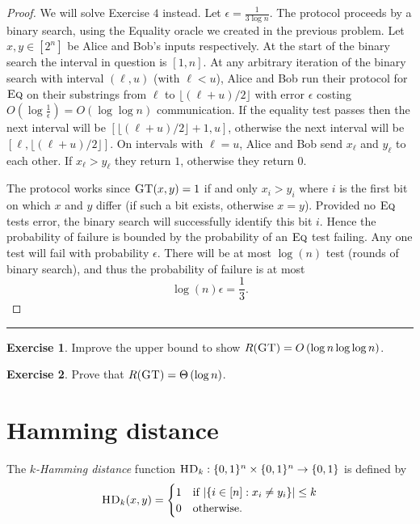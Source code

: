 \documentclass[11pt]{amsart}
\theoremstyle{plain}
\theoremstyle{definition}
\newtheorem{exercise}{Exercise}
\theoremstyle{plain}
\newcommand{\Eq}{\textsc{Eq}}
\newcommand{\GT}{\textsc{GT}}
\newcommand{\HD}{\textsc{HD}}
\newcommand{\exercises}{\bigskip \noindent\rule{8cm}{0.4pt} \medskip}
\begin{document}
\begin{proof}
We will solve Exercise $4$ instead. Let $\epsilon = \frac{1}{3\log n}$. The protocol proceeds by a binary search, using the Equality oracle we created in the previous problem. Let $x, y \in [2^n]$ be Alice and Bob's inputs respectively. At the start of the binary search the interval in question is $[1,n]$. At any arbitrary iteration of the binary search with interval $(\ell, u)$ (with $\ell < u$), Alice and Bob run their protocol for $\Eq$ on their substrings from $\ell$ to $\lfloor (\ell+u)/2 \rfloor$ with error $\epsilon$ costing $O(\log \frac{1}{\epsilon}) = O(\log\log n)$ communication. If the equality test passes then the next interval will be $[\lfloor (\ell+u)/2 \rfloor + 1, u]$, otherwise the next interval will be $[\ell, \lfloor (\ell+u)/2 \rfloor]$. On intervals with $\ell = u$, Alice and Bob send $x_\ell$ and $y_\ell$ to each other. If $x_\ell > y_\ell$ they return $1$, otherwise they return $0$.

The protocol works since $\GT(x,y) = 1$ if and only $x_i > y_i$ where $i$ is the first bit on which $x$ and $y$ differ (if such a bit exists, otherwise $x=y$). Provided no $\Eq$ tests error, the binary search will successfully identify this bit $i$. Hence the probability of failure is bounded by the probability of an $\Eq$ test failing. Any one test will fail with probability $\epsilon$. There will be at most $\log(n)$ test (rounds of binary search), and thus the probability of failure is at most
$$\log(n) \epsilon = \frac{1}{3}.$$
\end{proof}

\exercises

\begin{exercise}
Improve the upper bound to show $R(\GT) = O\left(\log n \log \log n \right)$.
\end{exercise}

\begin{exercise}
Prove that $R(\GT) = \Theta\left(\log n \right)$.
\end{exercise}


\newpage 
\section{Hamming distance}

The \emph{$k$-Hamming distance} function $\HD_k : \{0,1\}^n \times \{0,1\}^n \to \{0,1\}$ is defined by
\[
\HD_k(x,y) = \begin{cases}
1 & \mbox{if } |\{i \in [n] : x_i \neq y_i\}| \le k \\
0 & \mbox{otherwise.}
\end{cases}
\]
\end{document}
